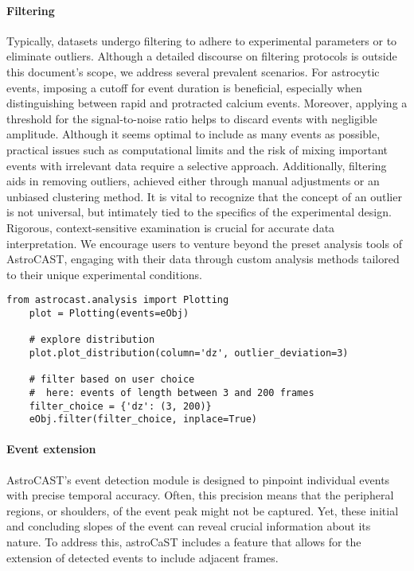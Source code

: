 \paragraph{Filtering}
Typically, datasets undergo filtering to adhere to experimental parameters or to eliminate outliers. Although a detailed discourse on filtering protocols is outside this document's scope, we address several prevalent scenarios. For astrocytic events, imposing a cutoff for event duration is beneficial, especially when distinguishing between rapid and protracted calcium events. Moreover, applying a threshold for the signal-to-noise ratio helps to discard events with negligible amplitude. Although it seems optimal to include as many events as possible, practical issues such as computational limits and the risk of mixing important events with irrelevant data require a selective approach. Additionally, filtering aids in removing outliers, achieved either through manual adjustments or an unbiased clustering method. It is vital to recognize that the concept of an outlier is not universal, but intimately tied to the specifics of the experimental design. Rigorous, context-sensitive examination is crucial for accurate data interpretation. We encourage users to venture beyond the preset analysis tools of AstroCAST, engaging with their data through custom analysis methods tailored to their unique experimental conditions.

\begin{lstlisting}[style=pyStyle]
    from astrocast.analysis import Plotting
    plot = Plotting(events=eObj)

    # explore distribution
    plot.plot_distribution(column='dz', outlier_deviation=3)

    # filter based on user choice
    #  here: events of length between 3 and 200 frames
    filter_choice = {'dz': (3, 200)}
    eObj.filter(filter_choice, inplace=True)
\end{lstlisting}

\paragraph{Event extension}
AstroCAST's event detection module is designed to pinpoint individual events with precise temporal accuracy. Often, this precision means that the peripheral regions, or shoulders, of the event peak might not be captured. Yet, these initial and concluding slopes of the event can reveal crucial information about its nature. To address this, astroCaST includes a feature that allows for the extension of detected events to include adjacent frames.

